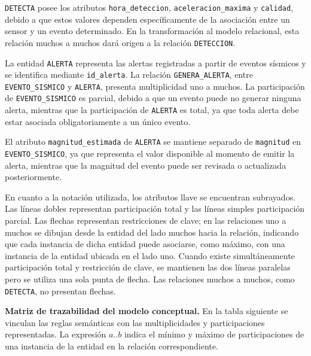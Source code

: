 \documentclass[12pt,a4paper]{article}
\begin{document}
\texttt{DETECTA} posee los atributos \texttt{hora\_\allowbreak{}deteccion}, \texttt{aceleracion\_\allowbreak{}maxima} y \texttt{calidad}, debido a que estos valores dependen específicamente de la asociación entre un sensor y un evento determinado. En la transformación al modelo relacional, esta relación muchos a muchos dará origen a la relación \texttt{DETECCION}.

La entidad \texttt{ALERTA} representa las alertas registradas a partir de eventos sísmicos y se identifica mediante \texttt{id\_\allowbreak{}alerta}. La relación \texttt{GENERA\_\allowbreak{}ALERTA}, entre \texttt{EVENTO\_\allowbreak{}SISMICO} y \texttt{ALERTA}, presenta multiplicidad uno a muchos. La participación de \texttt{EVENTO\_\allowbreak{}SISMICO} es parcial, debido a que un evento puede no generar ninguna alerta, mientras que la participación de \texttt{ALERTA} es total, ya que toda alerta debe estar asociada obligatoriamente a un único evento.

El atributo \texttt{magnitud\_\allowbreak{}estimada} de \texttt{ALERTA} se mantiene separado de \texttt{magnitud} en \texttt{EVENTO\_\allowbreak{}SISMICO}, ya que representa el valor disponible al momento de emitir la alerta, mientras que la magnitud del evento puede ser revisada o actualizada posteriormente.

En cuanto a la notación utilizada, los atributos llave se encuentran subrayados. Las líneas dobles representan participación total y las líneas simples participación parcial. Las flechas representan restricciones de clave; en las relaciones uno a muchos se dibujan desde la entidad del lado muchos hacia la relación, indicando que cada instancia de dicha entidad puede asociarse, como máximo, con una instancia de la entidad ubicada en el lado uno. Cuando existe simultáneamente participación total y restricción de clave, se mantienen las dos líneas paralelas pero se utiliza una sola punta de flecha. Las relaciones muchos a muchos, como \texttt{DETECTA}, no presentan flechas.

\noindent
\textbf{Matriz de trazabilidad del modelo conceptual.} En la tabla siguiente se vinculan las reglas semánticas con las multiplicidades y participaciones representadas. La expresión \(a..b\) indica el mínimo y máximo de participaciones de una instancia de la entidad en la relación correspondiente.
\end{document}
